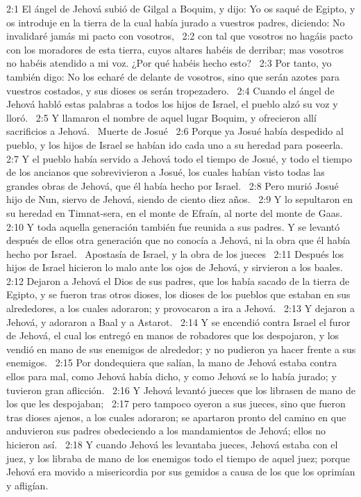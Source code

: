 2:1 El ángel de Jehová subió de Gilgal a Boquim, y dijo: Yo os saqué de Egipto, y os introduje en la tierra de la cual había jurado a vuestros padres, diciendo: No invalidaré jamás mi pacto con vosotros,  
2:2 con tal que vosotros no hagáis pacto con los moradores de esta tierra, cuyos altares habéis de derribar; mas vosotros no habéis atendido a mi voz. ¿Por qué habéis hecho esto?  
2:3 Por tanto, yo también digo: No los echaré de delante de vosotros, sino que serán azotes para vuestros costados, y sus dioses os serán tropezadero.  
2:4 Cuando el ángel de Jehová habló estas palabras a todos los hijos de Israel, el pueblo alzó su voz y lloró.  
2:5 Y llamaron el nombre de aquel lugar Boquim, y ofrecieron allí sacrificios a Jehová.  
Muerte de Josué   
2:6 Porque ya Josué había despedido al pueblo, y los hijos de Israel se habían ido cada uno a su heredad para poseerla.  
2:7 Y el pueblo había servido a Jehová todo el tiempo de Josué, y todo el tiempo de los ancianos que sobrevivieron a Josué, los cuales habían visto todas las grandes obras de Jehová, que él había hecho por Israel.  
2:8 Pero murió Josué hijo de Nun, siervo de Jehová, siendo de ciento diez años.  
2:9 Y lo sepultaron en su heredad en Timnat-sera, en el monte de Efraín, al norte del monte de Gaas.  
2:10 Y toda aquella generación también fue reunida a sus padres. Y se levantó después de ellos otra generación que no conocía a Jehová, ni la obra que él había hecho por Israel.  
Apostasía de Israel, y la obra de los jueces  
2:11 Después los hijos de Israel hicieron lo malo ante los ojos de Jehová, y sirvieron a los baales.  
2:12 Dejaron a Jehová el Dios de sus padres, que los había sacado de la tierra de Egipto, y se fueron tras otros dioses, los dioses de los pueblos que estaban en sus alrededores, a los cuales adoraron; y provocaron a ira a Jehová.  
2:13 Y dejaron a Jehová, y adoraron a Baal y a Astarot.  
2:14 Y se encendió contra Israel el furor de Jehová, el cual los entregó en manos de robadores que los despojaron, y los vendió en mano de sus enemigos de alrededor; y no pudieron ya hacer frente a sus enemigos.  
2:15 Por dondequiera que salían, la mano de Jehová estaba contra ellos para mal, como Jehová había dicho, y como Jehová se lo había jurado; y tuvieron gran aflicción.  
2:16 Y Jehová levantó jueces que los librasen de mano de los que les despojaban;  
2:17 pero tampoco oyeron a sus jueces, sino que fueron tras dioses ajenos, a los cuales adoraron; se apartaron pronto del camino en que anduvieron sus padres obedeciendo a los mandamientos de Jehová; ellos no hicieron así.  
2:18 Y cuando Jehová les levantaba jueces, Jehová estaba con el juez, y los libraba de mano de los enemigos todo el tiempo de aquel juez; porque Jehová era movido a misericordia por sus gemidos a causa de los que los oprimían y afligían. 
